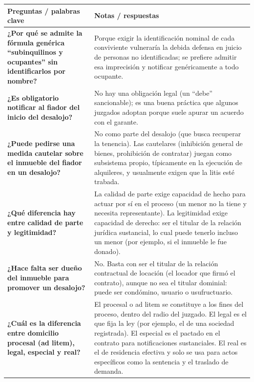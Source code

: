 \documentclass[12pt,oneside]{book}
\begin{document}
\begin{table}[H]
\centering
\begin{tabularx}{\textwidth}{
    >{\raggedright\arraybackslash}p{}
    >{\raggedright\arraybackslash}X
}
\toprule
\textbf{Preguntas / palabras clave} & \textbf{Notas / respuestas} \\
\midrule

\textbf{¿Por qué se admite la fórmula genérica ``subinquilinos y ocupantes'' sin identificarlos por nombre?} &
Porque exigir la identificación nominal de cada conviviente vulneraría la debida defensa en juicio de personas no identificadas; se prefiere admitir esa imprecisión y notificar genéricamente a todo ocupante. \\

\textbf{¿Es obligatorio notificar al fiador del inicio del desalojo?} &
No hay una obligación legal (un ``debe'' sancionable); es una buena práctica que algunos juzgados adoptan porque suele apurar un acuerdo con el garante. \\

\textbf{¿Puede pedirse una medida cautelar sobre el inmueble del fiador en un desalojo?} &
No como parte del desalojo (que busca recuperar la tenencia). Las cautelares (inhibición general de bienes, prohibición de contratar) juegan como subsistema propio, típicamente en la ejecución de alquileres, y usualmente exigen que la litis esté trabada. \\

\textbf{¿Qué diferencia hay entre calidad de parte y legitimidad?} &
La calidad de parte exige capacidad de hecho para actuar por sí en el proceso (un menor no la tiene y necesita representante). La legitimidad exige capacidad de derecho: ser el titular de la relación jurídica sustancial, lo cual puede tenerlo incluso un menor (por ejemplo, si el inmueble le fue donado). \\

\textbf{¿Hace falta ser dueño del inmueble para promover un desalojo?} &
No. Basta con ser el titular de la relación contractual de locación (el locador que firmó el contrato), aunque no sea el titular dominial: puede ser condómino, usuario o usufructuario. \\

\textbf{¿Cuál es la diferencia entre domicilio procesal (ad litem), legal, especial y real?} &
El procesal o ad litem se constituye a los fines del proceso, dentro del radio del juzgado. El legal es el que fija la ley (por ejemplo, el de una sociedad registrada). El especial es el pactado en el contrato para notificaciones sustanciales. El real es el de residencia efectiva y solo se usa para actos específicos como la sentencia y el traslado de demanda. \\


\end{tabularx}
\end{table}
\end{document}
